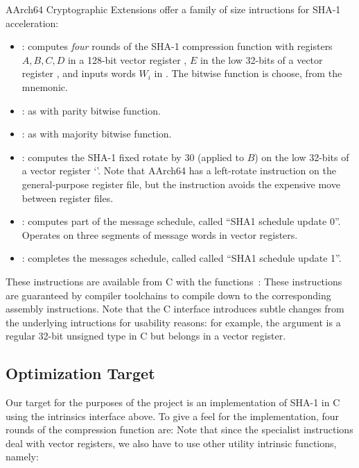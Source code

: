 AArch64 Cryptographic Extensions offer a family of size intructions for SHA-1
acceleration:
%
\begin{itemize}
    \item {}:
        computes \emph{four} rounds of the SHA-1 compression function with
        registers $A,B,C,D$ in a 128-bit vector register , $E$ in the
        low 32-bits of a vector register , and inputs words $W_i$ in
        . The bitwise function is choose, from the  mnemonic.
    \item {}:
        as  with parity bitwise function.
    \item {}:
        as  with majority bitwise function.
    \item {}:
        computes the SHA-1 fixed rotate by 30 (applied to $B$) on the low
        32-bits of a vector register `'. Note that AArch64 has a
        left-rotate instruction on the general-purpose register file, but the
         instruction avoids the expensive move between register
        files.
    \item {}:
        computes part of the message schedule, called ``SHA1 schedule update
        0''. Operates on three segments of message words in vector registers.
    \item {}:
        completes the messages schedule, called called ``SHA1 schedule update
        1''.
\end{itemize}

These instructions are available from C with the 
functions~\cite{arm-neon-sha}:
%
%
These instructions are guaranteed by compiler toolchains to compile down to the
corresponding assembly instructions.  Note that the C interface introduces
subtle changes from the underlying intructions for usability reasons: for
example, the  argument is a regular 32-bit unsigned type in C but
belongs in a vector register.

\subsection{Optimization Target}

Our target for the purposes of the project is an implementation of SHA-1 in C
using the intrinsics interface above. To give a feel for the implementation,
four rounds of the compression function are:
%
%
Note that since the specialist instructions deal with vector registers, we also
have to use other utility intrinsic functions, namely:
%

